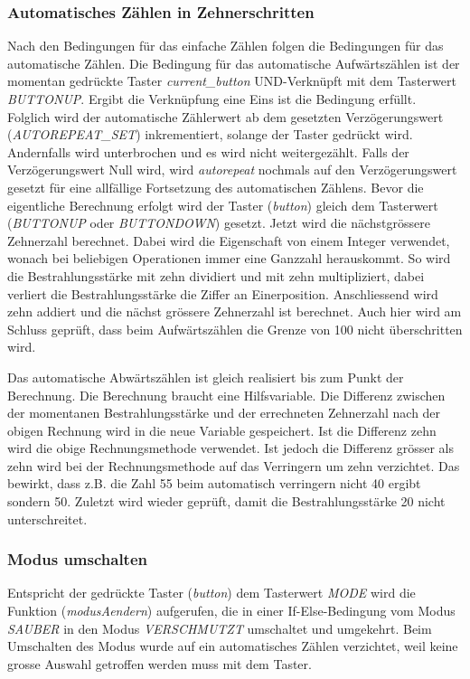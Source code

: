 \subsubsection{Automatisches Zählen in Zehnerschritten}
Nach den Bedingungen für das einfache Zählen folgen die Bedingungen für das automatische Zählen. Die Bedingung für das automatische Aufwärtszählen ist der momentan gedrückte Taster \textit{current\_button} UND-Verknüpft mit dem Tasterwert \textit{BUTTONUP}. Ergibt die Verknüpfung eine Eins ist die Bedingung erfüllt. Folglich wird der automatische Zählerwert ab dem gesetzten Verzögerungswert (\textit{AUTOREPEAT\_SET}) inkrementiert, solange der Taster gedrückt wird. Andernfalls wird unterbrochen und es wird nicht weitergezählt. Falls der Verzögerungswert Null wird, wird \textit{autorepeat} nochmals auf den Verzögerungswert gesetzt für eine allfällige Fortsetzung des automatischen Zählens. Bevor die eigentliche Berechnung erfolgt wird der Taster (\textit{button}) gleich dem Tasterwert (\textit{BUTTONUP} oder \textit{BUTTONDOWN}) gesetzt. Jetzt wird die nächstgrössere Zehnerzahl berechnet. Dabei wird die Eigenschaft von einem Integer verwendet, wonach bei beliebigen Operationen immer eine Ganzzahl herauskommt. So wird die Bestrahlungsstärke mit zehn dividiert und mit zehn multipliziert, dabei verliert die Bestrahlungsstärke die Ziffer an Einerposition. Anschliessend wird zehn addiert und die nächst grössere Zehnerzahl ist berechnet. Auch hier wird am Schluss geprüft, dass beim Aufwärtszählen die Grenze von 100 nicht überschritten wird.

Das automatische Abwärtszählen ist gleich realisiert bis zum Punkt der Berechnung. Die Berechnung braucht eine Hilfsvariable. Die Differenz zwischen der momentanen Bestrahlungsstärke und der errechneten Zehnerzahl nach der obigen Rechnung wird in die neue Variable gespeichert. Ist die Differenz zehn wird die obige Rechnungsmethode verwendet. Ist jedoch die Differenz grösser als zehn wird bei der Rechnungsmethode auf das Verringern um zehn verzichtet. Das bewirkt, dass z.B. die Zahl 55 beim automatisch verringern nicht 40 ergibt sondern 50. Zuletzt wird wieder geprüft, damit die Bestrahlungsstärke 20 nicht unterschreitet.

\subsubsection{Modus umschalten}
Entspricht der gedrückte Taster (\textit{button}) dem Tasterwert \textit{MODE} wird die Funktion (\textit{modusAendern}) aufgerufen, die in einer If-Else-Bedingung vom Modus \textit{SAUBER} in den Modus \textit{VERSCHMUTZT} umschaltet und umgekehrt. Beim Umschalten des Modus wurde auf ein automatisches Zählen verzichtet, weil keine grosse Auswahl getroffen werden muss mit dem Taster.

